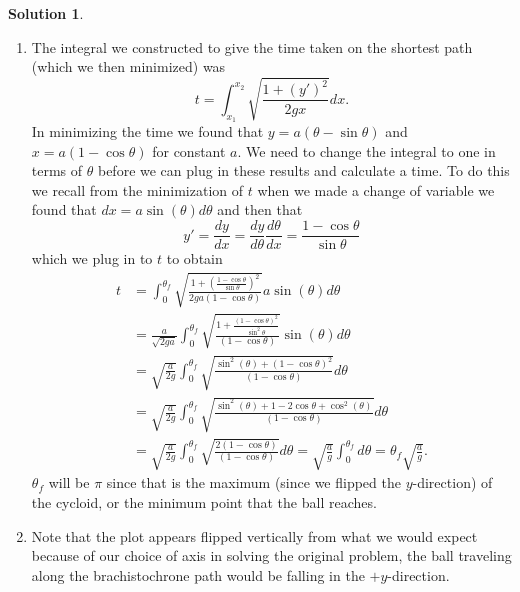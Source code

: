 \documentclass[10pt]{article}
\theoremstyle{definition}
\newtheorem{soln}{Solution}
\begin{document}
\begin{soln}~
  \begin{enumerate}[label=(\alph*)]
    \item The integral we constructed to give the time taken on the shortest path (which we then minimized) was
          $$t=\int_{x_1}^{x_2}\sqrt{\frac{1+(y')^2}{2gx}}dx.$$
          In minimizing the time we found that $y=a(\theta-\sin\theta)$ and $x=a(1-\cos\theta)$ for constant $a$. We need to change the integral to
          one in terms of $\theta$ before we can plug in these results and calculate a time. To do this we recall from the minimization of $t$
          when we made a change of variable we found that $dx=a\sin(\theta)d\theta$ and then that
          $$y'=\frac{dy}{dx}=\frac{dy}{d\theta}\frac{d\theta}{dx}=\frac{1-\cos\theta}{\sin\theta}$$
          which we plug in to $t$ to obtain
          \begin{align*}
            t & =\int_{0}^{\theta_f}\sqrt{\frac{1+(\frac{1-\cos\theta}{\sin\theta})^2}{2ga(1-\cos\theta)}}a\sin(\theta)d\theta                                                       \\
              & =\frac{a}{\sqrt{2ga}}\int_{0}^{\theta_f}\sqrt{\frac{1+\frac{(1-\cos\theta)^2}{\sin^2\theta}}{(1-\cos\theta)}}\sin(\theta)d\theta                                     \\
              & =\sqrt{\frac{a}{2g}}\int_{0}^{\theta_f}\sqrt{\frac{\sin^2(\theta)+(1-\cos\theta)^2}{(1-\cos\theta)}}d\theta                                                          \\
              & =\sqrt{\frac{a}{2g}}\int_{0}^{\theta_f}\sqrt{\frac{\sin^2(\theta)+1-2\cos\theta+\cos^2(\theta)}{(1-\cos\theta)}}d\theta                                              \\
              & =\sqrt{\frac{a}{2g}}\int_{0}^{\theta_f}\sqrt{\frac{2(1-\cos\theta)}{(1-\cos\theta)}}d\theta=\sqrt{\frac{a}{g}}\int_{0}^{\theta_f}d\theta=\theta_f\sqrt{\frac{a}{g}}.
          \end{align*}
          $\theta_f$ will be $\pi$ since that is the maximum (since we flipped the $y$-direction) of the cycloid, or the minimum point that the ball reaches.
    \item Note that the plot appears flipped vertically from what we would expect because of our choice of axis in solving the original problem,
          the ball traveling along the brachistochrone path would be falling in the $+y$-direction.
          ~\begin{center}
          \end{center}
  \end{enumerate}
\end{soln}
\end{document}
